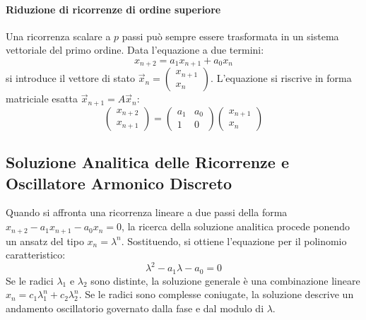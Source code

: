 \documentclass[12pt,a4paper]{article}
\begin{document}
\paragraph{Riduzione di ricorrenze di ordine superiore}
Una ricorrenza scalare a $p$ passi può sempre essere trasformata in un sistema vettoriale del primo ordine. Data l'equazione a due termini:
\begin{equation}
x_{n+2} = a_1 x_{n+1} + a_0 x_n
\end{equation}
si introduce il vettore di stato $\vec{x}_n = \begin{pmatrix} x_{n+1} \\ x_n \end{pmatrix}$. L'equazione si riscrive in forma matriciale esatta $\vec{x}_{n+1} = A\vec{x}_n$:
\begin{equation}
\begin{pmatrix} x_{n+2} \\ x_{n+1} \end{pmatrix} = \begin{pmatrix} a_1 & a_0 \\ 1 & 0 \end{pmatrix} \begin{pmatrix} x_{n+1} \\ x_n \end{pmatrix}
\end{equation}

\subsection{Soluzione Analitica delle Ricorrenze e Oscillatore Armonico Discreto}
Quando si affronta una ricorrenza lineare a due passi della forma $x_{n+2} - a_1 x_{n+1} - a_0 x_n = 0$, la ricerca della soluzione analitica procede ponendo un ansatz del tipo $x_n = \lambda^n$. Sostituendo, si ottiene l'equazione per il polinomio caratteristico:
\begin{equation}
\lambda^2 - a_1 \lambda - a_0 = 0
\end{equation}
Se le radici $\lambda_1$ e $\lambda_2$ sono distinte, la soluzione generale è una combinazione lineare $x_n = c_1 \lambda_1^n + c_2 \lambda_2^n$. Se le radici sono complesse coniugate, la soluzione descrive un andamento oscillatorio governato dalla fase e dal modulo di $\lambda$.
\end{document}
